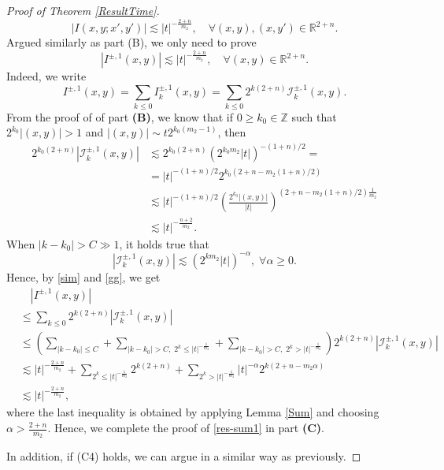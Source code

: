 \documentclass[a4paper,11pt, reqno]{amsart}
\numberwithin{equation}{section}
\theoremstyle{plain}
\theoremstyle{definition}
\theoremstyle{remark}
\begin{document}
\begin{proof}[Proof of Theorem \ref{ResultTime}]
\begin{equation*}
|I(x,y;x',y')|\lesssim |t|^{-\frac{2+n}{m_2}},\quad \forall (x,y),(x,y')\in \mathbb{R}^{2+n}.
\end{equation*}
Argued similarly as part {(B)}, we only need to prove
\begin{equation*}
|I^{\pm,1}(x,y)|\lesssim |t|^{-\frac{2+n}{m_2}},\quad \forall (x,y)\in \mathbb{R}^{2+n}.
\end{equation*}
Indeed, we write
\begin{equation*}
I^{\pm,1}(x,y)=\sum_{k\leq0}I_k^{\pm,1}(x,y)=\sum_{k\leq0}2^{k(2+n)}\mathcal{I}_k^{\pm,1}(x,y).
\end{equation*}
From the proof of of part \textbf{(B)}, we know that if $0\geq k_0\in\mathbb{Z} $ such that $2^{k_0}|(x,y)|>1$ and $|(x,y)|\sim t2^{k_0(m_2-1)}$, then
\begin{equation}\label{sim}
 \begin{aligned}
  2^{k_0(2+n)}\left|\mathcal{I}_k^{\pm,1}(x,y)\right|
  &\lesssim 2^{k_0(2+n)}\left(2^{k_0m_2}|t|\right)^{-(1+n)/2}=\\
  &=|t|^{-(1+n)/2}2^{k_0\left(2+n-m_2(1+n)/2\right)}\\
  &\lesssim |t|^{-(1+n)/2}\left(\frac{2^{k_0}|(x,y)|}{|t|}\right)^{\left(2+n-m_2(1+n)/2\right)\frac{1}{m_2}}\\
  &\lesssim |t|^{-\frac{n+2}{m_2}}.
  \end{aligned}
 \end{equation}
When $|k-k_0|>C\gg1$, it holds true that
 \begin{equation}\label{gg}
\left|\mathcal{I}_k^{\pm,1}(x,y)\right|\lesssim\left(2^{km_2}|t|\right)^{-\alpha},\;\forall \alpha\geq0.
 \end{equation}
Hence, by \eqref{sim} and \eqref{gg}, we get
 \begin{equation}\label{last}
 \begin{aligned}
  &\quad \left|I^{\pm,1}(x,y)\right|\\
&\leq\sum_{k\leq0}2^{k(2+n)}\left|\mathcal{I}_k^{\pm,1}(x,y)\right|\\
  &\leq \left(\sum_{|k-k_0|\leq C}+\sum_{|k-k_0|>C,\;2^k\leq|t|^{-\frac{1}{m_2}}}+\sum_{|k-k_0|>C,\;2^k>|t|^{-\frac{1}{m_2}}}\right)2^{k(2+n)}\left|\mathcal{I}_k^{\pm,1}(x,y)\right|\\
  &\lesssim |t|^{-\frac{2+n}{m_2}}+\sum_{2^k\leq|t|^{-\frac{1}{m_2}}}2^{k(2+n)}+\sum_{2^k>|t|^{-\frac{1}{m_2}}}|t|^{-\alpha}2^{k(2+n-m_2\alpha)}\\
  &\lesssim |t|^{-\frac{2+n}{m_2}},
  \end{aligned}
  \end{equation}
 where the last inequality is obtained by applying Lemma \ref{Sum} and choosing $\alpha>\frac{2+n}{m_2}$. Hence, we complete the proof of \eqref{res-sum1} in part \textbf{(C)}.
 
 
 In addition, if (C4) holds, we can argue in a similar way as previously.
 \end{proof}
\end{document}
